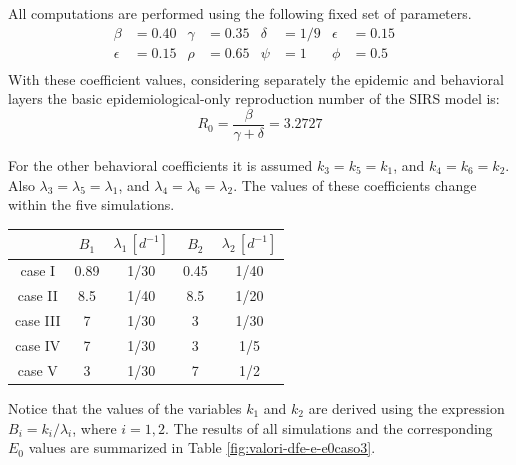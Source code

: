 All computations are performed using the following fixed set of parameters.
\begin{align*}
\beta &= 0.40  &\gamma &= 0.35 & \delta &= 1/9 &  \epsilon &= 0.15 &\\
\epsilon &= 0.15 & \rho &= 0.65  &\psi &= 1 & \phi &= 0.5 &   \\	
\end{align*}
With these coefficient values, considering separately the epidemic and behavioral layers the basic epidemiological-only reproduction number of the SIRS model is:
 \begin{equation*}
 	R_0= \frac{\beta}{\gamma+\delta} = 3.2727 
 \end{equation*}
 
For the other behavioral coefficients it is assumed $k_3 = k_5 = k_1$, and $k_4 = k_6 = k_2$. Also $\lambda_3 = \lambda_5 = \lambda_1$, and  $\lambda_4 = \lambda_6 = \lambda_2$. 
The values of these coefficients change within the five simulations.
\begin{center}
 \begin{tabular}{|c|c|c|c|c|}
 	\hline
 	& $B_1$ & $\lambda_1 \,[d^{-1}]$ & $B_2$ & $\lambda_2 \, [d^{-1}]$ \\
 	\hline
 	case I & 0.89 & 1/30 & 0.45 & 1/40 \\
 	\hline
 	case II & 8.5 & 1/40 & 8.5 & 1/20 \\
 	\hline
 	case III & 7 & 1/30 & 3 & 1/30 \\
 	\hline
 	case IV & 7 & 1/30 & 3 & 1/5 \\
 	\hline
 	case V & 3 & 1/30 & 7 & 1/2 \\
 	\hline
 \end{tabular}
\end{center}
Notice that the values of the variables $k_1$ and $k_2$ are derived using the expression $B_i = k_i/\lambda_i$, where $i = 1, 2$.
The results of all simulations and the corresponding $E_0$ values are summarized in Table \ref{fig:valori-dfe-e-e0caso3}.

